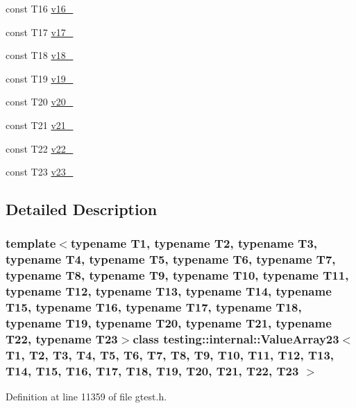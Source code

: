 \begin{DoxyCompactItemize}
\item 
const \-T16 \hyperlink{classtesting_1_1internal_1_1ValueArray23_a8b2b80d31925c1583c3e694d2bf235c5}{v16\-\_\-}
\item 
const \-T17 \hyperlink{classtesting_1_1internal_1_1ValueArray23_a9f59ea9e6f3642f77227dd1f7882d649}{v17\-\_\-}
\item 
const \-T18 \hyperlink{classtesting_1_1internal_1_1ValueArray23_ad07972ee98135c8deb090fc891a04e3e}{v18\-\_\-}
\item 
const \-T19 \hyperlink{classtesting_1_1internal_1_1ValueArray23_a3ad77b5b43c14332dabc9d47c8907e7f}{v19\-\_\-}
\item 
const \-T20 \hyperlink{classtesting_1_1internal_1_1ValueArray23_adb43992f7b5f5f07e0187003b8c9c872}{v20\-\_\-}
\item 
const \-T21 \hyperlink{classtesting_1_1internal_1_1ValueArray23_a80089b2eaa99efb5d3559378fbdac426}{v21\-\_\-}
\item 
const \-T22 \hyperlink{classtesting_1_1internal_1_1ValueArray23_aeec4c711a4f7cf166e6a2646aa7d0bc7}{v22\-\_\-}
\item 
const \-T23 \hyperlink{classtesting_1_1internal_1_1ValueArray23_a7f672a4a694f749a8b6119bff7705a66}{v23\-\_\-}
\end{DoxyCompactItemize}


\subsection{\-Detailed \-Description}
\subsubsection*{template$<$typename T1, typename T2, typename T3, typename T4, typename T5, typename T6, typename T7, typename T8, typename T9, typename T10, typename T11, typename T12, typename T13, typename T14, typename T15, typename T16, typename T17, typename T18, typename T19, typename T20, typename T21, typename T22, typename T23$>$class testing\-::internal\-::\-Value\-Array23$<$ T1, T2, T3, T4, T5, T6, T7, T8, T9, T10, T11, T12, T13, T14, T15, T16, T17, T18, T19, T20, T21, T22, T23 $>$}



\-Definition at line 11359 of file gtest.\-h.



